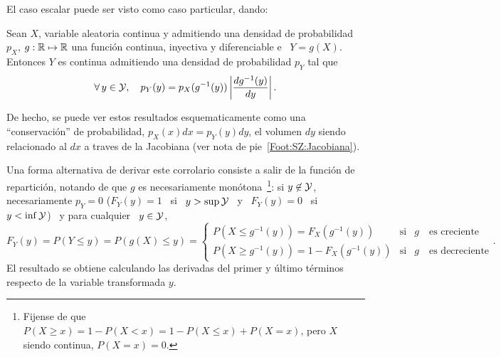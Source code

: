 El caso escalar puede ser visto como caso particular, dando:
%
\begin{corolario}
\label{Cor:MP:TransformacionInyectivaDensidadEscalar}
%
  Sean  $X$,   variable  aleatoria  continua   y  admitiendo  una   densidad  de
  probabilidad $p_X$, $g:\mathbb{R} \mapsto  \mathbb{R}$ una funci\'on continua, inyectiva
  y  diferenciable e  \ $Y  = g(X)$.   Entonces $Y$  es continua  admitiendo una
  densidad de probabilidad $p_Y$ tal que
  \[
  \forall  \,   y  \in  \mathcal{Y},   \quad  p_Y(y)  =  p_X(g^{-1}(y))   \left|  \frac{d
      g^{-1}(y)}{dy} \right|.
  \]
\end{corolario}
%
\noindent  De hecho,  se puede  ver estos  resultados esquematicamente  como una
``conservaci\'on'' de  probabilidad, $p_X(x)  dx = p_Y(y)  dy$, el  volumen $dy$
siendo   relacionado  al  $dx$   a  traves   de  la   Jacobiana  (ver   nota  de
pie~\ref{Foot:SZ:Jacobiana}).

Una  forma  alternativa  de derivar  este  corrolario  consiste  a salir  de  la
funci\'on   de   repartici\'on,   notando   de   que   $g$   es   necesariamente
mon\'otona~\footnote{Fijense de que $P(X \ge x) = 1 -  P(X < x) = 1 - P(X \le x) +
  P(X =  x)$, pero $X$ siendo  continua, $ P(X =  x) = 0$.}: si  $y \not\in \mathcal{Y}$,
necesariamente $p_Y = 0$ ($F_Y(y) = 1$ \ si \ $y > \sup \mathcal{Y}$ \ y \ $F_Y(y) = 0$ \
si \ $y < \inf \mathcal{Y}$) \ y para cualquier \ $y \in \mathcal{Y}$,
%
\[
F_Y(y) = P(Y \le y) = P(g(X) \le y) =
\left\{\begin{array}{lll}
P(X \le g^{-1}(y)) = F_X(g^{-1}(y)) & \mbox{si} & g \quad \mbox{es creciente}\\[2.5mm]
%
P(X \ge g^{-1}(y)) = 1 - F_X(g^{-1}(y)) & \mbox{si} & g \quad \mbox{es decreciente}
\end{array}\right..
\]
%
El  resultado  se  obtiene  calculando  las  derivadas  del  primer  y  \'ultimo
t\'erminos respecto de la variable transformada $y$.


